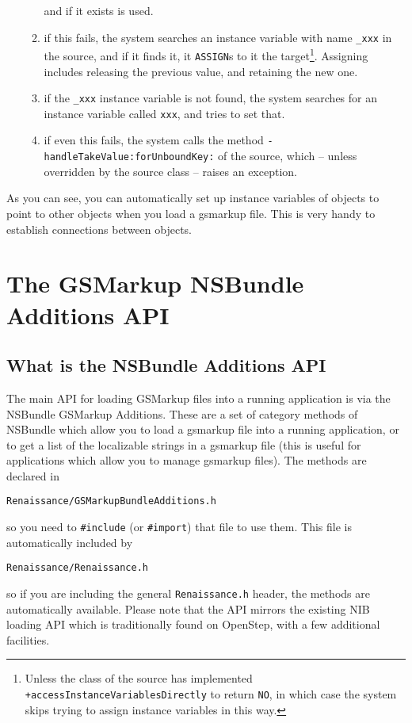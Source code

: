 \begin{enumerate}
\begin{enumerate}
and if it exists is used.
\item if this fails, the system searches an instance variable with name
\texttt{\_xxx} in the source, and if it finds it, it \texttt{ASSIGN}s to it
the target\footnote{Unless the class of the source has implemented
\texttt{+accessInstanceVariablesDirectly} to return \texttt{NO}, in
which case the system skips trying to assign instance variables in
this way.}.  Assigning includes releasing the previous value, and
retaining the new one.
\item if the \texttt{\_xxx} instance variable is not found, the system
searches for an instance variable called \texttt{xxx}, and tries to set
that.
\item if even this fails, the system calls the method
\texttt{-handleTakeValue:forUnboundKey:} of the source, which -- unless
overridden by the source class -- raises an exception.
\end{enumerate}
\end{enumerate}
As you can see, you can automatically set up instance variables of
objects to point to other objects when you load a gsmarkup file.  This is
very handy to establish connections between objects.

\section{The GSMarkup NSBundle Additions API}

\subsection{What is the NSBundle Additions API}
The main API for loading GSMarkup files into a running application is via
the NSBundle GSMarkup Additions.  These are a set of category methods of
NSBundle which allow you to load a gsmarkup file into a running
application, or to get a list of the localizable strings in a gsmarkup
file (this is useful for applications which allow you to manage gsmarkup
files).  The methods are declared in
\begin{verbatim}
Renaissance/GSMarkupBundleAdditions.h
\end{verbatim}
so you need to \texttt{\#include} (or \texttt{\#import}) that file to
use them.  This file is automatically included by
\begin{verbatim}
Renaissance/Renaissance.h
\end{verbatim}
so if you are including the general \texttt{Renaissance.h} header, the
methods are automatically available.  Please note that the API mirrors
the existing NIB loading API which is traditionally found on OpenStep,
with a few additional facilities.


